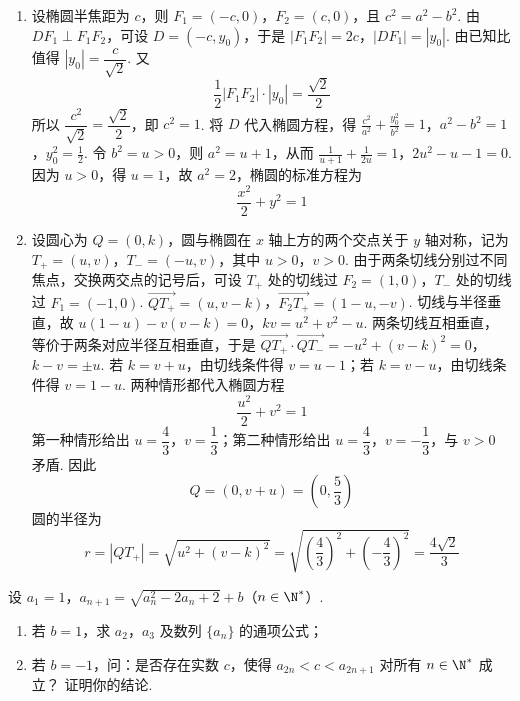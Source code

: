 \begin{solution}
\begin{enumerate}
\item 设椭圆半焦距为 \(c\)，则 \(F_1=(-c,0)\)，\(F_2=(c,0)\)，且
\(c^2=a^2-b^2\). 由 \(DF_1\perp F_1F_2\)，可设 \(D=(-c,y_0)\)，于是
\(|F_1F_2|=2c\)，\(|DF_1|=|y_0|\).
由已知比值得 \(|y_0|=\dfrac{c}{\sqrt{2}}\). 又
\[
\frac{1}{2}|F_1F_2|\cdot|y_0|=\frac{\sqrt{2}}{2}
\]
所以 \(\dfrac{c^2}{\sqrt{2}}=\dfrac{\sqrt{2}}{2}\)，即 \(c^2=1\). 将 \(D\) 代入椭圆方程，得
\(\frac{c^2}{a^2}+\frac{y_0^2}{b^2}=1\)，\(a^2-b^2=1\)，\(y_0^2=\frac{1}{2}\).
令 \(b^2=u>0\)，则 \(a^2=u+1\)，从而
\(\frac{1}{u+1}+\frac{1}{2u}=1\)，\(2u^2-u-1=0\).
因为 \(u>0\)，得 \(u=1\)，故 \(a^2=2\)，椭圆的标准方程为
\[
\frac{x^2}{2}+y^2=1
\]

\item 设圆心为 \(Q=(0,k)\)，圆与椭圆在 \(x\) 轴上方的两个交点关于 \(y\) 轴对称，记为 \(T_+=(u,v)\)，\(T_-=(-u,v)\)，其中 \(u>0\)，\(v>0\). 由于两条切线分别过不同焦点，交换两交点的记号后，可设 \(T_+\) 处的切线过 \(F_2=(1,0)\)，\(T_-\) 处的切线过 \(F_1=(-1,0)\).
\(\overrightarrow{QT_+}=(u,v-k)\)，\(\overrightarrow{F_2T_+}=(1-u,-v)\).
切线与半径垂直，故
\(u(1-u)-v(v-k)=0\)，\(kv=u^2+v^2-u\).
两条切线互相垂直，等价于两条对应半径互相垂直，于是
\(\overrightarrow{QT_+}\cdot\overrightarrow{QT_-} =-u^2+(v-k)^2=0\)，\(k-v=\pm u\).
若 \(k=v+u\)，由切线条件得 \(v=u-1\)；若 \(k=v-u\)，由切线条件得 \(v=1-u\). 两种情形都代入椭圆方程
\[
\frac{u^2}{2}+v^2=1
\]
第一种情形给出 \(u=\dfrac{4}{3}\)，\(v=\dfrac{1}{3}\)；第二种情形给出 \(u=\dfrac{4}{3}\)，\(v=-\dfrac{1}{3}\)，与 \(v>0\) 矛盾. 因此
\[
Q=\left(0,v+u\right)=\left(0,\frac{5}{3}\right)
\]
圆的半径为
\[
r=|QT_+|=\sqrt{u^2+(v-k)^2}
 =\sqrt{\left(\frac{4}{3}\right)^2+\left(-\frac{4}{3}\right)^2}
 =\frac{4\sqrt{2}}{3}
\]
\end{enumerate}
\end{solution}

\begin{problem}
设 \(a_1 = 1\)，\(a_{n+1} = \sqrt{a_n^2 - 2a_n + 2} + b\)（\(n \in \N^*\)）.

\begin{enumerate}
\item 若 \(b = 1\)，求 \(a_2\)，\(a_3\) 及数列 \(\{a_n\}\) 的通项公式；
\item 若 \(b = -1\)，问：是否存在实数 \(c\)，使得 \(a_{2n} < c < a_{2n+1}\) 对所有 \(n \in \N^*\) 成立？ 证明你的结论.
\end{enumerate}
\end{problem}

